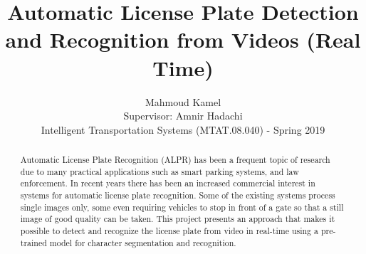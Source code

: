 \documentclass[letterpaper,12pt]{article}
\begin{document}
\title{Automatic License Plate Detection and Recognition from Videos (Real Time)}

\author{Mahmoud Kamel\\[1cm]{Supervisor: Amnir Hadachi}\\[1cm]{\small Intelligent Transportation Systems (MTAT.08.040) - Spring 2019}}

\date{\vspace{-5ex}}
\maketitle


\vspace{30 mm}
\begin{abstract}
Automatic License Plate Recognition (ALPR) has been a frequent topic of research due to many practical applications such as smart parking systems, and law enforcement. In recent years there has been an increased commercial interest in systems
for automatic license plate recognition. Some of the existing systems process single images only, some even requiring vehicles to stop in front of a gate so that a still image of good quality can be taken. This project presents an approach that makes it possible to detect and recognize the license plate from video in real-time using a pre-trained model for character segmentation and recognition.
\end{abstract}
\end{document}
